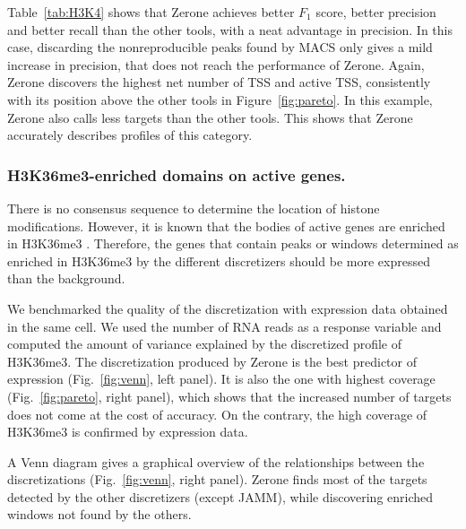 \documentclass{bioinfo}
\begin{document}
Table~\ref{tab:H3K4} shows that Zerone achieves better $F_1$ score,
better precision and better recall than the other tools, with
a neat advantage in precision. In this case, discarding the
nonreproducible peaks found by MACS only gives a mild increase in
precision, that does not reach the performance of Zerone.
Again, Zerone discovers the highest net number of TSS and active
TSS, consistently with its position above the other tools in
Figure~\ref{fig:pareto}. In this example, Zerone also calls
less targets than the other tools. This shows that Zerone accurately
describes profiles of this category.

\subsubsection{H3K36me3-enriched domains on active genes.}
\label{subsub:h3k36me3}
There is no consensus sequence to determine the location of histone
modifications. However, it is known that the bodies of active genes
are enriched in H3K36me3 \citep{pmid16122420,pmid23739122}. Therefore,
the genes that contain peaks or windows determined as enriched in
H3K36me3 by the different discretizers should be more expressed than
the background.

We benchmarked the quality of the discretization with expression
data obtained in the same cell. We used the number of RNA reads
as a response variable and computed the amount of variance
explained by the discretized profile of H3K36me3. The discretization
produced by Zerone is the best predictor of expression
(Fig.~\ref{fig:venn}, left panel). It is also the one with highest coverage
(Fig.~\ref{fig:pareto}, right panel), which shows that the increased number of
targets does not come at the cost of accuracy. On the contrary,
the high coverage of H3K36me3 is confirmed by expression data.

A Venn diagram gives a graphical overview of the relationships
between the discretizations (Fig.~\ref{fig:venn}, right panel). Zerone finds
most of the targets detected by the other discretizers (except JAMM),
while discovering enriched windows not found by the others.
\end{document}
